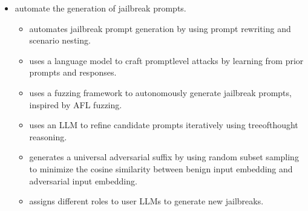 \documentclass[letterpaper,11pt,english]{sphinxmanual}
\begin{document}
\begin{itemize}
\begin{itemize}
\item {} 
\sphinxAtStartPar
{} uses non\sphinxhyphen{}English languages to expose the
vulnerabilities of LLMs by using translated prompts to generate
unsafe content.

\item {} 
\sphinxAtStartPar
{} uses less commonly used languages
to bypass protective measures and elicit harmful responses.

\item {} 
\sphinxAtStartPar
{} encrypts queries into a format that is challenging
for LLMs to detect, then incorporates decryption functions in
instructions so that LLMs can understand the encrypted content. For
example, encrypting a prompt and using code to decrypt and execute
it.

\end{itemize}

\item {} 
\sphinxAtStartPar
{} automate the generation of jailbreak
prompts.
\begin{itemize}
\item {} 
\sphinxAtStartPar
{} automates jailbreak prompt generation by using prompt
rewriting and scenario nesting.

\item {} 
\sphinxAtStartPar
{} uses a language
model to craft prompt\sphinxhyphen{}level attacks by learning from prior prompts
and responses.

\item {} 
\sphinxAtStartPar
{} uses a fuzzing framework to autonomously generate
jailbreak prompts, inspired by AFL fuzzing.

\item {} 
\sphinxAtStartPar
{} uses an LLM to refine
candidate prompts iteratively using tree\sphinxhyphen{}of\sphinxhyphen{}thought reasoning.

\item {} 
\sphinxAtStartPar
{} generates a universal adversarial suffix
by using random subset sampling to minimize the cosine similarity
between benign input embedding and adversarial input embedding.

\item {} 
\sphinxAtStartPar
{} assigns different roles to user LLMs to generate new
jailbreaks.


\end{itemize}
\end{itemize}
\end{document}
